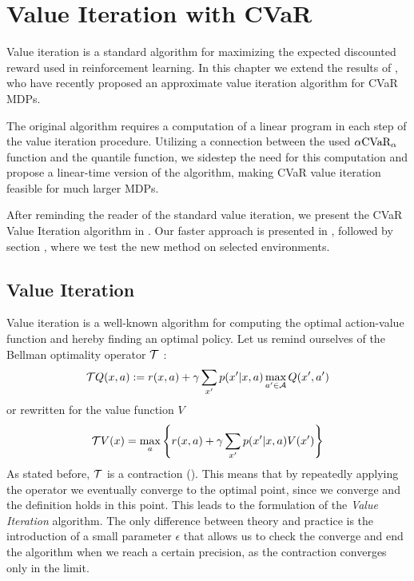 \chapter{Value Iteration with CVaR}\label{ch:vi}

Value iteration is a standard algorithm for maximizing the expected discounted reward used in reinforcement learning. In this chapter we extend the results of \citet{chow2015risk}, who have recently proposed an approximate value iteration algorithm for CVaR MDPs. 

The original algorithm requires a computation of a linear program in each step of the value iteration procedure. Utilizing a connection between the used $\alpha \text{CVaR}_\alpha$ function and the quantile function, we sidestep the need for this computation and propose a linear-time version of the algorithm, making CVaR value iteration feasible for much larger MDPs. 

After reminding the reader of the standard value iteration, we present the CVaR Value Iteration algorithm in . Our faster approach is presented in  , followed by section , where we test the new method on selected environments.


\section{Value Iteration}

Value iteration \citep{sutton1998reinforcement} is a well-known algorithm for computing the optimal action-value function and hereby finding an optimal policy. Let us remind ourselves of the Bellman optimality operator $\mathcal{T}$ :
\begin{equation*}
\mathcal{T} Q(x,a) := r(x, a) + \gamma \sum_{x'}p(x'|x, a) \max_{a' \in \mathcal{A}}Q(x', a')
\end{equation*}
or rewritten for the value function $V$
\begin{equation}
\mathcal{T} V(x) = \max_a\left\{ {r(x, a) + \gamma\sum_{x'}p(x'|x, a)V(x')} \right\}
\end{equation}
As stated before, $\mathcal{T}$ is a contraction (). This means that by repeatedly applying the operator we eventually converge to the optimal point, since we converge and the definition holds in this point. This leads to the formulation of the \textit{Value Iteration} algorithm. The only difference between theory and practice is the introduction of a small parameter $\epsilon$ that allows us to check the converge and end the algorithm when we reach a certain precision, as the contraction converges only in the limit.

